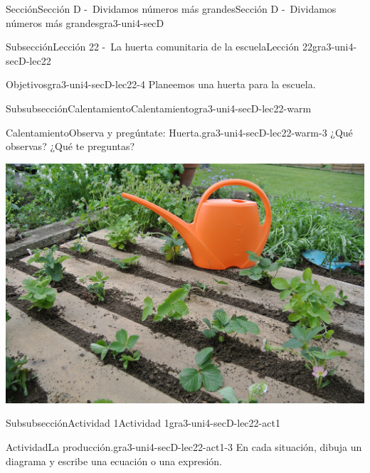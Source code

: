 \documentclass[twoside,10pt,]{article}
\begin{document}
\begin{sectionptx}{Sección}{Sección D -~Dividamos números más grandes}{}{Sección D -~Dividamos números más grandes}{}{}{gra3-uni4-secD}
\typeout{************************************************}
%
\begin{subsectionptx}{Subsección}{Lección 22 -~La huerta comunitaria de la escuela}{}{Lección 22}{}{}{gra3-uni4-secD-lec22}
\begin{objectives}{Objetivos}{gra3-uni4-secD-lec22-4}
Planeemos una huerta para la escuela.%
\end{objectives}
%
%
\typeout{************************************************}
\typeout{************************************************}
%
\begin{subsubsectionptx}{Subsubsección}{Calentamiento}{}{Calentamiento}{}{}{gra3-uni4-secD-lec22-warm}
\begin{exploration}{Calentamiento}{Observa y pregúntate: Huerta.}{gra3-uni4-secD-lec22-warm-3}%
¿Qué observas? ¿Qué te preguntas?%
\begin{image}{0.125}{0.75}{0.125}{}%
\includegraphics[width=\linewidth]{external/jpg-source/3-4-D-22-warm-garden-934189_1920.jpg}
\end{image}%
\end{exploration}%
\end{subsubsectionptx}
%
%
\typeout{************************************************}
\typeout{************************************************}
%
\begin{subsubsectionptx}{Subsubsección}{Actividad 1}{}{Actividad 1}{}{}{gra3-uni4-secD-lec22-act1}
\begin{activity}{Actividad}{La producción.}{gra3-uni4-secD-lec22-act1-3}%
En cada situación, dibuja un diagrama y escribe una ecuación o una expresión.%

\end{activity}
\end{subsubsectionptx}
\end{subsectionptx}
\end{sectionptx}
\end{document}
